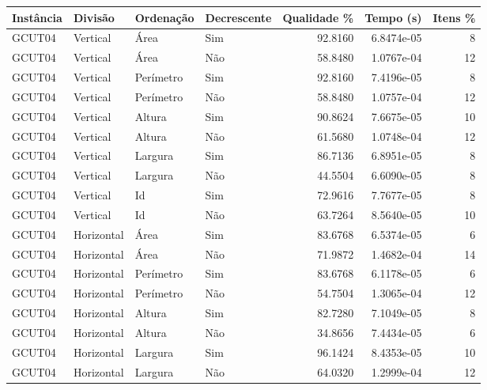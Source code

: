 \begin{tabular}{llllrrr}
    \hline
    Instância & Divisão     & Ordenação & Decrescente & Qualidade \% & Tempo (s)  & Itens \% \\
    \hline
    GCUT04    & Vertical    & Área      & Sim         & 92.8160      & 6.8474e-05 & 8        \\
    GCUT04    & Vertical    & Área      & Não         & 58.8480      & 1.0767e-04 & 12       \\
    GCUT04    & Vertical    & Perímetro & Sim         & 92.8160      & 7.4196e-05 & 8        \\
    GCUT04    & Vertical    & Perímetro & Não         & 58.8480      & 1.0757e-04 & 12       \\
    GCUT04    & Vertical    & Altura    & Sim         & 90.8624      & 7.6675e-05 & 10       \\
    GCUT04    & Vertical    & Altura    & Não         & 61.5680      & 1.0748e-04 & 12       \\
    GCUT04    & Vertical    & Largura   & Sim         & 86.7136      & 6.8951e-05 & 8        \\
    GCUT04    & Vertical    & Largura   & Não         & 44.5504      & 6.6090e-05 & 8        \\
    GCUT04    & Vertical    & Id        & Sim         & 72.9616      & 7.7677e-05 & 8        \\
    GCUT04    & Vertical    & Id        & Não         & 63.7264      & 8.5640e-05 & 10       \\
    GCUT04    & Horizontal  & Área      & Sim         & 83.6768      & 6.5374e-05 & 6        \\
    GCUT04    & Horizontal  & Área      & Não         & 71.9872      & 1.4682e-04 & 14       \\
    GCUT04    & Horizontal  & Perímetro & Sim         & 83.6768      & 6.1178e-05 & 6        \\
    GCUT04    & Horizontal  & Perímetro & Não         & 54.7504      & 1.3065e-04 & 12       \\
    GCUT04    & Horizontal  & Altura    & Sim         & 82.7280      & 7.1049e-05 & 8        \\
    GCUT04    & Horizontal  & Altura    & Não         & 34.8656      & 7.4434e-05 & 6        \\
    GCUT04    & Horizontal  & Largura   & Sim         & 96.1424      & 8.4353e-05 & 10       \\
    GCUT04    & Horizontal  & Largura   & Não         & 64.0320      & 1.2999e-04 & 12       \\

\end{tabular}
